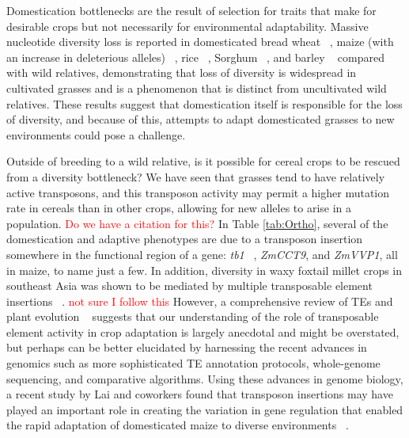\documentclass[12pt]{article}
\newcommand{\mbh}[1]{\textcolor{red}{\normalsize  #1}}
\begin{document}
Domestication bottlenecks are the result of selection for traits that make for desirable crops but not necessarily for environmental adaptability.
Massive nucleotide diversity loss is reported in domesticated bread wheat ~\citep{Haudry2007}, maize (with an increase in deleterious alleles) ~\citep{pmid9539756, Wang2017}, rice ~\citep{pmid17218640}, Sorghum ~\citep{Hamblin2006}, and barley ~\citep{Kilian2006} compared with wild relatives, demonstrating that loss of diversity is widespread in cultivated grasses and is a phenomenon that is distinct from uncultivated wild relatives.
These results suggest that domestication itself is responsible for the loss of diversity, and because of this, attempts to adapt domesticated grasses to new environments could pose a challenge.  

Outside of breeding to a wild relative, is it possible for cereal crops to be rescued from a diversity bottleneck?
We have seen that grasses tend to have relatively active transposons, and this transposon activity may permit a higher mutation rate in cereals than in other crops, allowing for new alleles to arise in a population. \mbh{Do we have a citation for this?}
In Table \ref{tab:Ortho}, several of the domestication and adaptive phenotypes are due to a transposon insertion somewhere in the functional region of a gene: \textit{tb1} ~\citep{Studer2011}, \textit{ZmCCT9}, and \textit{ZmVVP1}, all in maize, to name just a few.
In addition, diversity in waxy foxtail millet crops in southeast Asia was shown to be mediated by multiple transposable element insertions ~\citep{Kawase2005}. \mbh{not sure I follow this}
However, a comprehensive review of TEs and plant evolution ~\citep{Lisch2001} suggests that our understanding of the role of transposable element activity in crop adaptation is largely anecdotal and might be overstated, but perhaps can be better elucidated by harnessing the recent advances in genomics such as more sophisticated TE annotation protocols, whole-genome sequencing, and comparative algorithms.
Using these advances in genome biology, a recent study by Lai and coworkers found that transposon insertions may have played an important role in creating the variation in gene regulation that enabled the rapid adaptation of domesticated maize to diverse environments ~\citep{Lai2017}. 
\end{document}
